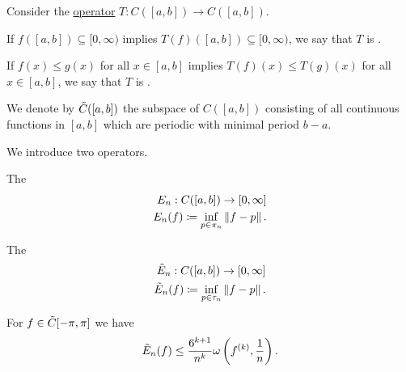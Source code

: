 \begin{definition}\label{def:real_function_space_operators}
  Consider the \hyperref[def:function/single_valued]{operator} \( T: C([a, b]) \to C([a, b]) \).

  \begin{DefEnum}
     If \( f([a, b]) \subseteq [0, \infty) \) implies \( T(f)([a, b]) \subseteq [0, \infty) \), we say that \( T \) is .

     If \( f(x) \leq g(x) \) for all \( x \in [a, b] \) implies \( T(f)(x) \leq T(g)(x) \) for all \( x \in [a, b] \), we say that \( T \) is .
  \end{DefEnum}
\end{definition}

\begin{definition}\label{def:periodic_function_space}
  We denote by \( \tilde{C}([a, b]) \) the subspace of \( C([a, b]) \) consisting of all continuous functions in \( [a, b] \) which are periodic with minimal period \( b - a \).
\end{definition}

\begin{definition}\label{def:approximation_error}
  We introduce two operators.

  \begin{DefEnum}
     The 
    \begin{align*}
      E_n: C([a, b]) \to [0, \infty] \\
      E_n(f) \coloneqq \inf_{p \in \pi_n} \left\Vert f - p \right\Vert.
    \end{align*}

     The 
    \begin{align*}
      \tilde{E}_n: C([a, b]) \to [0, \infty] \\
      \tilde{E}_n(f) \coloneqq \inf_{p \in \tau_n} \left\Vert f - p \right\Vert.
    \end{align*}
  \end{DefEnum}
\end{definition}

\begin{theorem}\label{thm:jacksons_trigonometric_theorem}
  For \( f \in \tilde{C}[-\pi, \pi] \) we have
  \begin{equation*}
    \tilde{E}_n(f) \leq \frac {6^{k+1}} {n^k} \omega\left(f^{(k)}, \frac 1 n \right).
  \end{equation*}
\end{theorem}

